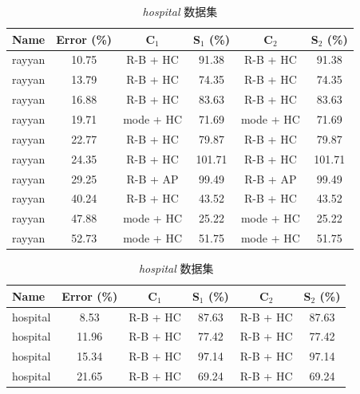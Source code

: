 \documentclass[10pt]{article} %
\numberwithin{equation}{section}
\begin{document}
\begin{table}[htbp]
    \begin{subtable}{0.48\linewidth} %
        \centering
        \caption{\textit{rayyan} 数据集}
        \label{tab:rayyan_results}
        \begin{tabular}{lccccc}
            \toprule
            \textbf{Name} & \textbf{Error (\%)} & \textbf{C$_1$} & \textbf{S$_1$ (\%)} & \textbf{C$_2$} & \textbf{S$_2$ (\%)} \\
            \midrule
            rayyan & 10.75  & R-B + HC  & 91.38  & R-B + HC  & 91.38  \\
            rayyan & 13.79  & R-B + HC  & 74.35  & R-B + HC  & 74.35  \\
            rayyan & 16.88  & R-B + HC  & 83.63  & R-B + HC  & 83.63  \\
            rayyan & 19.71  & mode + HC & 71.69  & mode + HC & 71.69  \\
            rayyan & 22.77  & R-B + HC  & 79.87  & R-B + HC  & 79.87  \\
            rayyan & 24.35  & R-B + HC  & 101.71 & R-B + HC  & 101.71 \\
            rayyan & 29.25  & R-B + AP  & 99.49  & R-B + AP  & 99.49  \\
            rayyan & 40.24  & R-B + HC  & 43.52  & R-B + HC  & 43.52  \\
            rayyan & 47.88  & mode + HC & 25.22  & mode + HC & 25.22  \\
            rayyan & 52.73  & mode + HC & 51.75  & mode + HC & 51.75  \\
            \bottomrule
        \end{tabular}
    \end{subtable}
    \hfill
    \begin{subtable}{0.48\linewidth} %
        \centering
        \caption{\textit{hospital} 数据集}
        \label{tab:hospital_results}
        \begin{tabular}{lccccc}
            \toprule
            \textbf{Name} & \textbf{Error (\%)} & \textbf{C$_1$} & \textbf{S$_1$ (\%)} & \textbf{C$_2$} & \textbf{S$_2$ (\%)} \\
            \midrule
            hospital & 8.53  & R-B + HC  & 87.63  & R-B + HC  & 87.63  \\
            hospital & 11.96 & R-B + HC  & 77.42  & R-B + HC  & 77.42  \\
            hospital & 15.34 & R-B + HC  & 97.14  & R-B + HC  & 97.14  \\
            hospital & 21.65 & R-B + HC  & 69.24  & R-B + HC  & 69.24  \\

\end{tabular}
\end{subtable}
\end{table}
\end{document}
